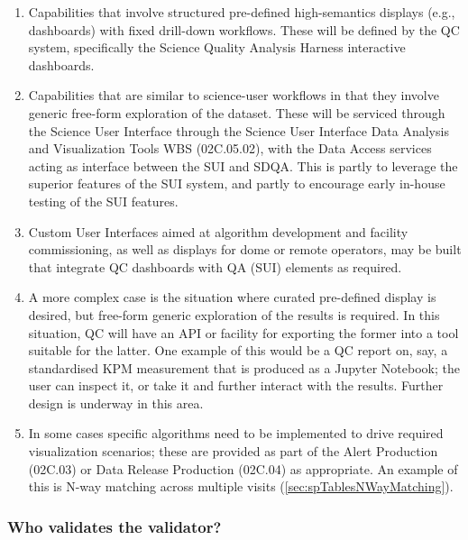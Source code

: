\begin{enumerate}

\item Capabilities that involve structured pre-defined high-semantics displays (e.g., dashboards) with fixed drill-down workflows. These will be defined by the QC system, specifically the Science Quality Analysis Harness interactive dashboards.

\item Capabilities that are similar to science-user workflows in that they involve generic free-form exploration of the dataset. These will be serviced through the Science User Interface through the Science User Interface Data Analysis and Visualization Tools WBS (02C.05.02), with the Data Access services acting as interface between the SUI and SDQA. This is partly to leverage the superior features of the SUI system, and partly to encourage early in-house testing of the SUI features.

\item Custom User Interfaces aimed at algorithm development and facility commissioning, as well as displays for dome or remote operators, may be built that integrate QC dashboards with QA (SUI) elements as required.

\item A more complex case is the situation where curated pre-defined display is desired, but free-form generic exploration of the results is required. In this situation, QC will have an API or facility for exporting the former into a tool suitable for the latter. One example of this would be a QC report on, say, a standardised KPM measurement that is produced as a Jupyter Notebook; the user can inspect it, or take it and further interact with the results. Further design is underway in this area.

\item In some cases specific algorithms need to be implemented to drive required visualization scenarios; these are provided as part of the Alert Production (02C.03) or Data Release Production (02C.04) as appropriate. An example of this is N-way matching across multiple visits (\ref{sec:spTablesNWayMatching}).

\end{enumerate}

\subsubsection{Who validates the validator?}
\label{sec:qaSelfValidation}

